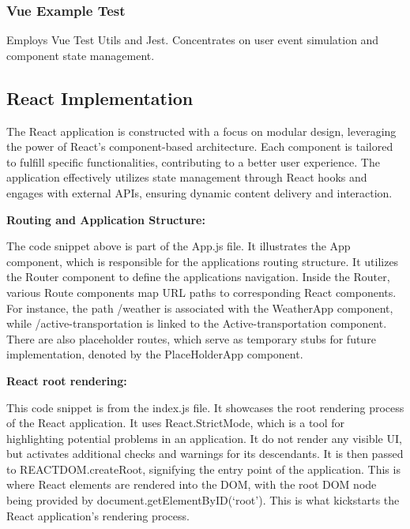 \subsubsection{Vue Example Test}

 

Employs Vue Test Utils and Jest. Concentrates on user event simulation and component state management. \\ \hline







\subsection{React Implementation}

The React application is constructed with a focus on modular design, leveraging the power of React's component-based architecture. Each component is tailored to fulfill specific functionalities, contributing to a better user experience. The application effectively utilizes state management through React hooks and engages with external APIs, ensuring dynamic content delivery and interaction.

\textbf{Routing and Application Structure:}




The code snippet above is part of the App.js file. It illustrates the App component, which is responsible for the applications routing structure. It utilizes the Router component to define the applications navigation. Inside the Router, various Route components map URL paths to corresponding React components. For instance, the path /weather is associated with the WeatherApp component, while /active-transportation is linked to the Active-transportation component. There are also placeholder routes, which serve as temporary stubs for future implementation, denoted by the PlaceHolderApp component.

\textbf{React root rendering:} 



This code snippet is from the index.js file. It showcases the root rendering process of the React application. It uses React.StrictMode, which is a tool for highlighting potential problems in an application. It do not render any visible UI, but activates additional checks and warnings for its descendants. It is then passed to REACTDOM.createRoot, signifying the entry point of the application. This is where React elements are rendered into the DOM, with the root DOM node being provided by document.getElementByID(‘root’). This is what kickstarts the React application’s rendering process. 


